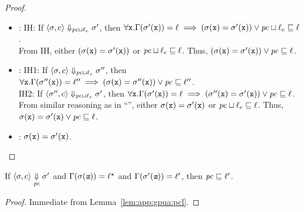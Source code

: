 \begin{proof}
\begin{itemize}
  \item {}: IH: If $\langle \sigma, c \rangle \Downarrow_{\mathit{pc} \sqcup \ell_e} \sigma'$, then $\forall
    \texttt{x}.\Gamma(\sigma'(\texttt{x})) = \ell \implies (\sigma(\texttt{x}) = \sigma'(\texttt{x})) \vee \mathit{pc}
    \sqcup \ell_e \sqsubseteq \ell$.\\
    From IH, either $(\sigma(\texttt{x}) = \sigma'(\texttt{x}))$ or $\mathit{pc} \sqcup \ell_e
    \sqsubseteq \ell$. Thus, $(\sigma(\texttt{x}) = \sigma'(\texttt{x})) \vee \mathit{pc} \sqsubseteq \ell$.
  \item {}: IH1: If $\langle \sigma, c \rangle \Downarrow_{\mathit{pc}
      \sqcup \ell_e} \sigma''$, then $\forall
    \texttt{x}.\Gamma(\sigma''(\texttt{x})) = \ell'' \implies (\sigma(\texttt{x}) = \sigma''(\texttt{x})) \vee \mathit{pc}
    \sqsubseteq \ell''$.\\
    IH2: If $\langle \sigma'', c \rangle \Downarrow_{\mathit{pc} \sqcup \ell_e} \sigma'$, then $\forall
    \texttt{x}.\Gamma(\sigma'(\texttt{x})) = \ell \implies (\sigma''(\texttt{x}) = \sigma'(\texttt{x})) \vee \mathit{pc}
    \sqsubseteq \ell$.\\
    From similar reasoning as in ``'', either $\sigma(\texttt{x}) =
    \sigma'(\texttt{x})$ or $\mathit{pc} \sqcup \ell_e \sqsubseteq \ell$. Thus, $\sigma(\texttt{x}) =
    \sigma'(\texttt{x}) \vee \mathit{pc} \sqsubseteq \ell$. 
  \item {}:  $\sigma(\texttt{x}) = \sigma'(\texttt{x})$. 
\end{itemize}
\end{proof}

\begin{mycor}
\label{cor:app:gpua:cor2}
If $\langle \sigma, c \rangle \underset{\mathit{pc}}{\Downarrow} \sigma'$ and
$\Gamma(\sigma(\emph{\texttt{x}})) = \ell{}^\star $ and
$\Gamma(\sigma'(\emph{\texttt{x}})) = \ell'$, then 
$\mathit{pc} \sqsubseteq \ell'$.
\end{mycor}
\begin{proof}
Immediate from Lemma~\ref{lem:app:gpua:pcl}.
\end{proof}

